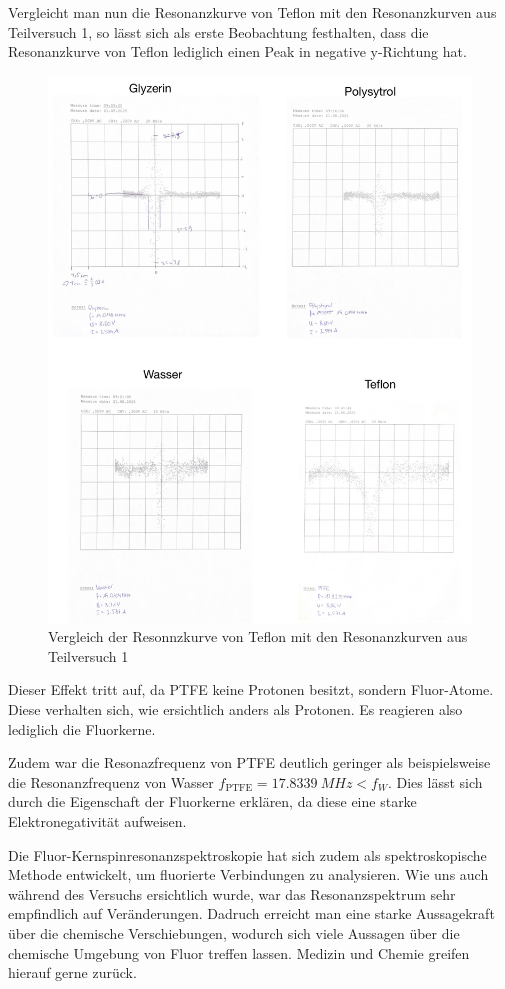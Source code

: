 \documentclass{article}
\begin{document}
Vergleicht man nun die Resonanzkurve von Teflon mit den Resonanzkurven aus Teilversuch 1, so lässt sich als erste Beobachtung festhalten, dass die Resonanzkurve von Teflon lediglich einen Peak in negative y-Richtung hat.

    \begin{figure}[H]
        \centering
        \includegraphics[width=0.7\linewidth]{Abbildungen/VergleichGraphenTV2.jpeg}
        \caption{Vergleich der Resonnzkurve von Teflon mit den Resonanzkurven aus Teilversuch 1}
    \end{figure}

Dieser Effekt tritt auf, da PTFE keine Protonen besitzt, sondern Fluor-Atome. Diese verhalten sich, wie ersichtlich anders als Protonen. Es reagieren also lediglich die Fluorkerne.

Zudem war die Resonazfrequenz von PTFE deutlich geringer als beispielsweise die Resonanzfrequenz von Wasser $f_\text{PTFE} = \qty{17.8339}{MHz} < f_W$. Dies lässt sich durch die Eigenschaft der Fluorkerne erklären, da diese eine starke Elektronegativität aufweisen. 

Die Fluor-Kernspinresonanzspektroskopie hat sich zudem als spektroskopische Methode entwickelt, um fluorierte Verbindungen zu analysieren. Wie uns auch während des Versuchs ersichtlich wurde, war das Resonanzspektrum sehr empfindlich auf Veränderungen. Dadruch erreicht man eine starke Aussagekraft über die chemische Verschiebungen, wodurch sich viele Aussagen über die chemische Umgebung von Fluor treffen lassen. Medizin und Chemie greifen hierauf gerne zurück. \cite{ww}
\end{document}
